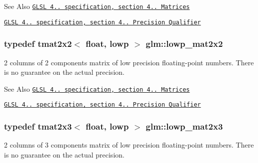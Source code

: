 \begin{DoxySeeAlso}{See Also}
\href{http://www.opengl.org/registry/doc/GLSLangSpec.4.20.8.pdf}{\tt G\-L\-S\-L 4.. specification, section 4.. Matrices} 

\href{http://www.opengl.org/registry/doc/GLSLangSpec.4.20.8.pdf}{\tt G\-L\-S\-L 4.. specification, section 4.. Precision Qualifier} 
\end{DoxySeeAlso}
\hypertarget{group__core__precision_ga764ca10ac431c7306adaf9e134795919}{
\subsubsection[{lowp\-\_\-mat2x2}]{\setlength{\rightskip}{0pt plus 5cm}typedef tmat2x2$<$ float, lowp $>$ {\bf glm\-::lowp\-\_\-mat2x2}}}\label{group__core__precision_ga764ca10ac431c7306adaf9e134795919}
2 columns of 2 components matrix of low precision floating-\/point numbers. There is no guarantee on the actual precision.

\begin{DoxySeeAlso}{See Also}
\href{http://www.opengl.org/registry/doc/GLSLangSpec.4.20.8.pdf}{\tt G\-L\-S\-L 4.. specification, section 4.. Matrices} 

\href{http://www.opengl.org/registry/doc/GLSLangSpec.4.20.8.pdf}{\tt G\-L\-S\-L 4.. specification, section 4.. Precision Qualifier} 
\end{DoxySeeAlso}
\hypertarget{group__core__precision_ga9fb4a4c96e13e4954bff1af2f99408cb}{
\subsubsection[{lowp\-\_\-mat2x3}]{\setlength{\rightskip}{0pt plus 5cm}typedef tmat2x3$<$ float, lowp $>$ {\bf glm\-::lowp\-\_\-mat2x3}}}\label{group__core__precision_ga9fb4a4c96e13e4954bff1af2f99408cb}
2 columns of 3 components matrix of low precision floating-\/point numbers. There is no guarantee on the actual precision.

